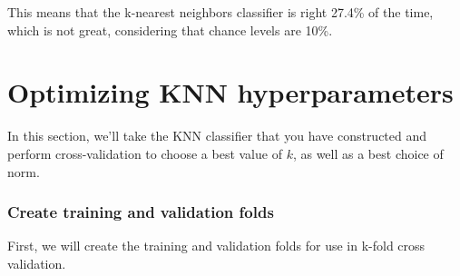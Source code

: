 \documentclass[11pt]{article}
\begin{document}
This means that the k-nearest neighbors classifier is right 27.4\% of
the time, which is not great, considering that chance levels are 10\%.

    \hypertarget{optimizing-knn-hyperparameters}{%
\section{Optimizing KNN
hyperparameters}\label{optimizing-knn-hyperparameters}}

In this section, we'll take the KNN classifier that you have constructed
and perform cross-validation to choose a best value of \(k\), as well as
a best choice of norm.

    \hypertarget{create-training-and-validation-folds}{%
\subsubsection{Create training and validation
folds}\label{create-training-and-validation-folds}}

First, we will create the training and validation folds for use in
k-fold cross validation.
\end{document}

